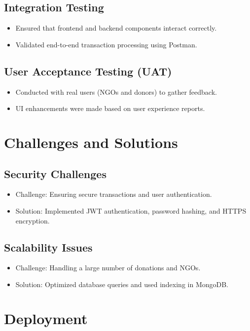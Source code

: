 \subsection{Integration Testing}
\begin{itemize}
    \item Ensured that frontend and backend components interact correctly.
    \item Validated end-to-end transaction processing using Postman.
\end{itemize}

\subsection{User Acceptance Testing (UAT)}
\begin{itemize}
    \item Conducted with real users (NGOs and donors) to gather feedback.
    \item UI enhancements were made based on user experience reports.
\end{itemize}

\section{Challenges and Solutions}
\subsection{Security Challenges}
\begin{itemize}
    \item Challenge: Ensuring secure transactions and user authentication.
    \item Solution: Implemented JWT authentication, password hashing, and HTTPS encryption.
\end{itemize}

\subsection{Scalability Issues}
\begin{itemize}
    \item Challenge: Handling a large number of donations and NGOs.
    \item Solution: Optimized database queries and used indexing in MongoDB.
\end{itemize}

\section{Deployment}
